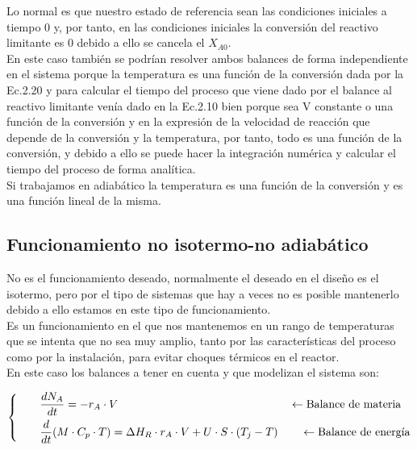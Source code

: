 Lo normal es que nuestro estado de referencia sean las condiciones iniciales a tiempo 0 y, por tanto, en las condiciones iniciales la conversión del reactivo limitante es 0 debido a ello se cancela el $X_{A0}$.\\
\vspace{1em}
En este caso también se podrían resolver ambos balances de forma independiente en el sistema porque la temperatura es una función de la conversión dada por la Ec.2.20 y para calcular el tiempo del proceso que viene dado por el balance al reactivo limitante venía dado en la Ec.2.10 bien porque sea V constante o una función de la conversión
y en la expresión de la velocidad de reacción que depende de la conversión y la temperatura, por tanto, todo es una función de la conversión, y debido a ello se puede hacer la integración numérica y calcular el tiempo del proceso de forma analítica.\\
\vspace{1em}
Si trabajamos en adiabático la temperatura es una función de la conversión y es una función lineal de la misma.

\subsection{Funcionamiento no isotermo-no adiabático}
No es el funcionamiento deseado, normalmente el deseado en el diseño es el isotermo, pero por el tipo de sistemas que hay a veces no es posible mantenerlo debido a ello estamos en este tipo de funcionamiento.\\
\vspace{1em}
Es un funcionamiento en el que nos mantenemos en un rango de temperaturas que se intenta que no sea muy amplio, tanto por las características del proceso como por la instalación, para evitar choques térmicos en el reactor.\\
\vspace{1em}
En este caso los balances a tener en cuenta y que modelizan el sistema son:

\begin{equation}
    \left\{
    \begin{aligned}
         & \hspace{2em}\frac{dN_A}{dt}                   = -r_A \cdot V       \hspace{15.2em}\leftarrow \text{Balance de materia}                                    \\
         & \hspace{2em}\frac{d}{dt}(M\cdot C_p \cdot T)  = \Delta H_R \cdot r_A \cdot V + U \cdot S \cdot (T_j - T) \hspace{2em}\leftarrow \text{Balance de energía}
    \end{aligned}
    \right.
\end{equation}

